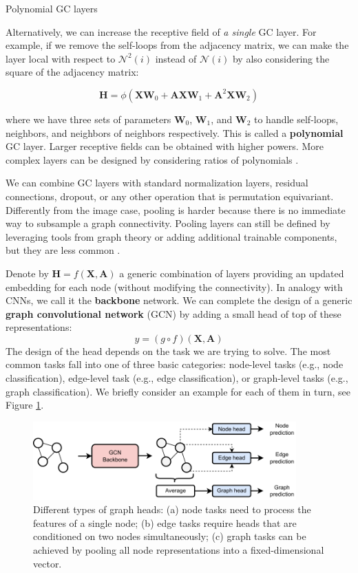 \begin{supportbox}{Polynomial GC layers}

Alternatively, we can increase the receptive field of \textit{a single} GC layer. For example, if we remove the self-loops from the adjacency matrix, we can make the layer local with respect to $\mathcal{N}^2(i)$ instead of $\mathcal{N}(i)$ by also considering the square of the adjacency matrix:

$$
\mathbf{H} = \phi\left(\mathbf{X}\mathbf{W}_0 + \mathbf{A}\mathbf{X}\mathbf{W}_1 + \mathbf{A}^2\mathbf{X}\mathbf{W}_2\right)
$$

where we have three sets of parameters $\mathbf{W}_0$, $\mathbf{W}_1$, and $\mathbf{W}_2$ to handle self-loops, neighbors, and neighbors of neighbors respectively. This is called a \textbf{polynomial} GC layer. Larger receptive fields can be obtained with higher powers. More complex layers can be designed by considering ratios of polynomials \cite{bianchi2021graph}.

\end{supportbox}

We can combine GC layers with standard normalization layers, residual connections, dropout, or any other operation that is permutation equivariant. Differently from the image case, pooling is harder because there is no immediate way to subsample a graph connectivity. Pooling layers can still be defined by leveraging tools from graph theory or adding additional trainable components, but they are less common \cite{grattarola2022understanding}.

Denote by $\mathbf{H} = f(\mathbf{X}, \mathbf{A})$ a generic combination of layers providing an updated embedding for each node (without modifying the connectivity). In analogy with CNNs, we call it the \textbf{backbone} network. We can complete the design of a generic \textbf{graph convolutional network} (GCN) by adding a small head of top of these representations:
%
$$
y=(g\circ f)(\mathbf{X},\mathbf{A})
$$
%
The design of the head depends on the task we are trying to solve. The most common tasks fall into one of three basic categories: node-level tasks (e.g., node classification), edge-level task (e.g., edge classification), or graph-level tasks (e.g., graph classification). We briefly consider an example for each of them in turn, see Figure \ref{fig:graph_heads}.

\begin{figure}[t]
    \centering
    \includegraphics[width=0.9\textwidth]{images/graph_heads}
    \caption{Different types of graph heads: (a) node tasks need to process the features of a single node; (b) edge tasks require heads that are conditioned on two nodes simultaneously; (c) graph tasks can be achieved by pooling all node representations into a fixed-dimensional vector.}
    \label{fig:graph_heads}
\end{figure}

